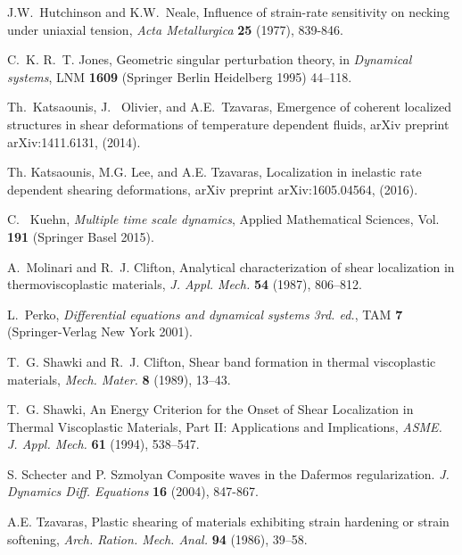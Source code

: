 \documentclass[a4paper,11pt]{article}
\numberwithin{step}{dummy}
\begin{document}
\begin{thebibliography}{10}
{\sc J.W.~Hutchinson and K.W.~Neale},
Influence of strain-rate sensitivity on necking under uniaxial tension,
{\it  Acta Metallurgica} {\bf 25} (1977), 839-846.


{\sc C.~K. R.~T. Jones}, 
Geometric singular perturbation theory, in {\it Dynamical systems}, LNM {\bf 1609} (Springer Berlin Heidelberg 1995) 44--118.






{\sc Th.~Katsaounis, J.~ Olivier, and A.E.~Tzavaras}, 
Emergence of coherent localized structures in shear deformations of temperature dependent fluids, arXiv preprint arXiv:1411.6131,  (2014).

{\sc Th. Katsaounis, M.G. Lee, and A.E. Tzavaras}, 
Localization in inelastic rate dependent shearing deformations, arXiv preprint arXiv:1605.04564,  (2016).

{\sc C.~ Kuehn}, 
{\it Multiple time scale dynamics}, Applied Mathematical Sciences, Vol. {\bf 191} (Springer Basel 2015).

{\sc A.~Molinari and R.~J. Clifton}, 
Analytical characterization of shear localization in thermoviscoplastic materials, 
{\it J. Appl. Mech.}
{\bf 54} (1987), 806--812.

{\sc L.~Perko}, 
{\it Differential equations and dynamical systems 3rd. ed.}, TAM {\bf 7} (Springer-Verlag New York 2001).  


{\sc T.~G. Shawki and R.~J. Clifton}, 
Shear band formation in thermal viscoplastic materials, 
{\it Mech. Mater.}
{\bf 8 } (1989), 13--43.

{\sc T.~G. Shawki},
{An Energy Criterion for the Onset of Shear Localization in Thermal Viscoplastic Materials, Part II: Applications and Implications}, {\it ASME. J. Appl. Mech.} 
{\bf 61} (1994), 538--547. 


{\sc S. Schecter and P. Szmolyan}
Composite waves in the Dafermos regularization.
{\it J. Dynamics Diff. Equations} {\bf 16} (2004), 847-867.

{\sc A.E. Tzavaras}, 
Plastic shearing of materials exhibiting strain hardening or strain softening, 
{\it Arch. Ration. Mech. Anal.}
{\bf 94} (1986), 39--58.


\end{thebibliography}
\end{document}
